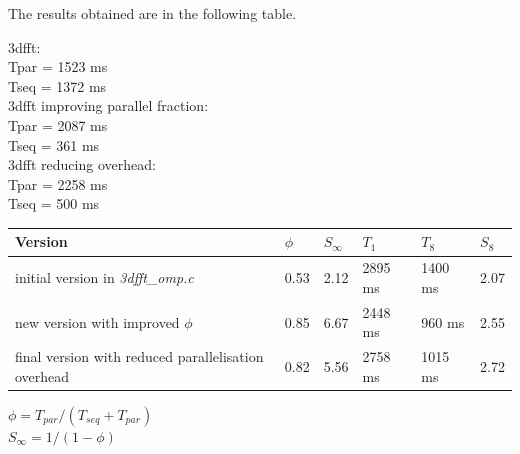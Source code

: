 \documentclass[12]{article}
\begin{document}





The results obtained are in the following table.

3dfft: \\
Tpar = 1523 ms \\
Tseq = 1372 ms \\

3dfft improving parallel fraction: \\
Tpar = 2087 ms \\
Tseq = 361 ms \\

3dfft reducing overhead: \\
Tpar = 2258 ms \\
Tseq = 500 ms \\

\bigskip

\begin{table}[H]
\begin{tabular}{|l|l|l|l|l|l|}
\hline \textbf{Version} & $\phi $ & $S_\infty$ & $T_1$ & $T_8$ & $S_8$ \\ \hline
initial version in \textit{3dfft\_omp.c} & 0.53 & 2.12 & 2895 ms & 1400 ms & 2.07 \\ \hline
new version with improved $\phi$ & 0.85 & 6.67 & 2448 ms & 960 ms & 2.55 \\ \hline
final version with reduced parallelisation overhead & 0.82 & 5.56 & 2758 ms & 1015 ms & 2.72 \\ \hline

\end{tabular}
\begin{center}
$\phi = T_{par} / (T_{seq} + T_{par}) $ \\
$S_\infty = 1 / (1 - \phi) $
\end{center}
\end{table}

\end{document}
